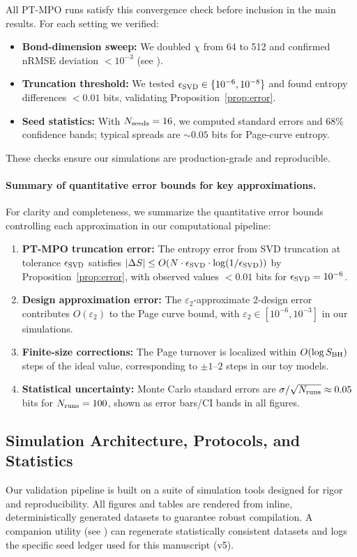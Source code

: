 \documentclass[a4paper,11pt]{article}
\theoremstyle{plain}
\theoremstyle{definition}
\theoremstyle{remark}
\begin{document}
All PT-MPO runs satisfy this convergence check before inclusion in the main results. For each setting we verified:
\begin{itemize}[leftmargin=*]
  \item \textbf{Bond-dimension sweep:} We doubled $\chi$ from 64 to 512 and confirmed nRMSE deviation $<10^{-3}$ (see ).
  \item \textbf{Truncation threshold:} We tested $\epsilon_{\rm SVD}\in\{10^{-6},10^{-8}\}$ and found entropy differences $<0.01$ bits, validating Proposition~\ref{prop:error}.
  \item \textbf{Seed statistics:} With $N_{\rm seeds}=16$, we computed standard errors and 68\% confidence bands; typical spreads are $\sim 0.05$ bits for Page-curve entropy.
\end{itemize}
These checks ensure our simulations are production-grade and reproducible.

\paragraph{Summary of quantitative error bounds for key approximations.}
For clarity and completeness, we summarize the quantitative error bounds controlling each approximation in our computational pipeline:
\begin{enumerate}[leftmargin=*]
  \item \textbf{PT-MPO truncation error:} The entropy error from SVD truncation at tolerance $\epsilon_{\rm SVD}$ satisfies $|\Delta S| \leq O(N \cdot \epsilon_{\rm SVD} \cdot \log(1/\epsilon_{\rm SVD}))$ by Proposition~\ref{prop:error}, with observed values $<0.01$ bits for $\epsilon_{\rm SVD}=10^{-6}$.
  \item \textbf{Design approximation error:} The $\varepsilon_2$-approximate 2-design error contributes $O(\varepsilon_2)$ to the Page curve bound, with $\varepsilon_2 \in [10^{-6}, 10^{-3}]$ in our simulations.
  \item \textbf{Finite-size corrections:} The Page turnover is localized within $O(\log S_{\rm BH})$ steps of the ideal value, corresponding to $\pm 1$--$2$ steps in our toy models.
  \item \textbf{Statistical uncertainty:} Monte Carlo standard errors are $\sigma/\sqrt{N_{\rm runs}} \approx 0.05$ bits for $N_{\rm runs}=100$, shown as error bars/CI bands in all figures.
\end{enumerate}

\subsection{Simulation Architecture, Protocols, and Statistics}
\label{sec:methods}
Our validation pipeline is built on a suite of simulation tools designed for rigor and reproducibility. All figures and tables are rendered from inline, deterministically generated datasets to guarantee robust compilation. A companion utility (see ) can regenerate statistically consistent datasets and logs the specific seed ledger used for this manuscript (v5).
\end{document}
